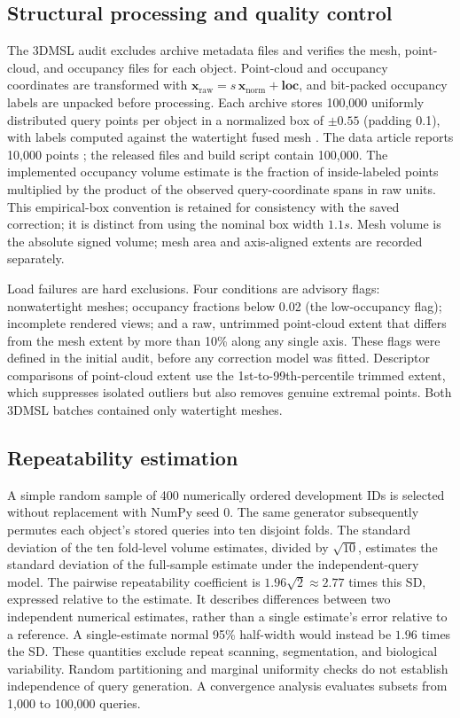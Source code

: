 \documentclass[journal]{IEEEtran}
\begin{document}
\subsection{Structural processing and quality control}

The 3DMSL audit excludes archive metadata files and verifies the mesh, point-cloud, and occupancy files for each object. Point-cloud and occupancy coordinates are transformed with $\mathbf{x}_{\mathrm{raw}}=s\,\mathbf{x}_{\mathrm{norm}}+\mathbf{loc}$, and bit-packed occupancy labels are unpacked before processing. Each archive stores 100,000 uniformly distributed query points per object in a normalized box of $\pm0.55$ (padding 0.1), with labels computed against the watertight fused mesh \cite{ref20}. The data article reports 10,000 points \cite{ref11}; the released files and build script contain 100,000. The implemented occupancy volume estimate is the fraction of inside-labeled points multiplied by the product of the observed query-coordinate spans in raw units. This empirical-box convention is retained for consistency with the saved correction; it is distinct from using the nominal box width $1.1s$. Mesh volume is the absolute signed volume; mesh area and axis-aligned extents are recorded separately.

Load failures are hard exclusions. Four conditions are advisory flags: nonwatertight meshes; occupancy fractions below 0.02 (the low-occupancy flag); incomplete rendered views; and a raw, untrimmed point-cloud extent that differs from the mesh extent by more than 10\% along any single axis. These flags were defined in the initial audit, before any correction model was fitted. Descriptor comparisons of point-cloud extent use the 1st-to-99th-percentile trimmed extent, which suppresses isolated outliers but also removes genuine extremal points. Both 3DMSL batches contained only watertight meshes.

\subsection{Repeatability estimation}

A simple random sample of 400 numerically ordered development IDs is selected without replacement with NumPy seed 0. The same generator subsequently permutes each object's stored queries into ten disjoint folds. The standard deviation of the ten fold-level volume estimates, divided by $\sqrt{10}$, estimates the standard deviation of the full-sample estimate under the independent-query model. The pairwise repeatability coefficient is $1.96\sqrt{2}\approx2.77$ times this SD, expressed relative to the estimate. It describes differences between two independent numerical estimates, rather than a single estimate's error relative to a reference. A single-estimate normal 95\% half-width would instead be $1.96$ times the SD. These quantities exclude repeat scanning, segmentation, and biological variability. Random partitioning and marginal uniformity checks do not establish independence of query generation. A convergence analysis evaluates subsets from 1,000 to 100,000 queries.
\end{document}

